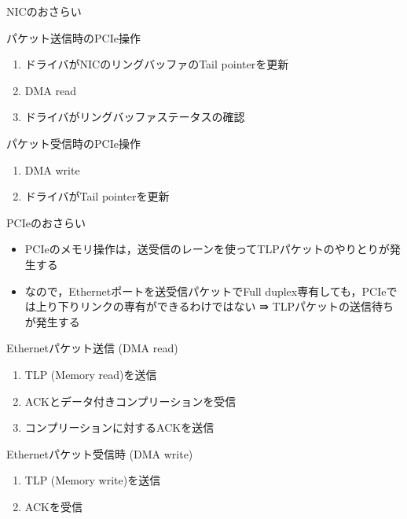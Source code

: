 \documentclass[10pt, compress]{beamer}
\begin{document}

\begin{frame}[fragile,t]{NICのおさらい}

\hspace{-0.5em}パケット送信時のPCIe操作
\vspace{-.5em}
\begin{enumerate}
	\item ドライバがNICのリングバッファのTail pointerを更新
	\item DMA read
	\item ドライバがリングバッファステータスの確認
\end{enumerate}

\hspace{-0.5em}パケット受信時のPCIe操作
\vspace{-.5em}
\begin{enumerate}
	\item DMA write
	\item ドライバがTail pointerを更新
\end{enumerate}
\end{frame}


\begin{frame}[fragile,t]{PCIeのおさらい}

\begin{itemize}
	\item PCIeのメモリ操作は，送受信のレーンを使ってTLPパケットのやりとりが発生する
	\item なので，Ethernetポートを送受信パケットでFull duplex専有しても，PCIeでは上り下りリンクの専有ができるわけではない ⇛ TLPパケットの送信待ちが発生する
\end{itemize}


\hspace{-0.5em}Ethernetパケット送信 (DMA read)
\vspace{-.5em}
\begin{enumerate}
	\item TLP (Memory read)を送信
	\item ACKとデータ付きコンプリーションを受信
	\item コンプリーションに対するACKを送信
\end{enumerate}

\hspace{-0.5em}Ethernetパケット受信時 (DMA write)
\vspace{-.5em}
\begin{enumerate}
	\item TLP (Memory write)を送信
	\item ACKを受信
\end{enumerate}
\end{frame}
\end{document}
